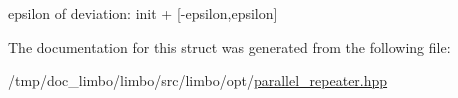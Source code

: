 epsilon of deviation\+: init + \mbox{[}-\/epsilon,epsilon\mbox{]} 



The documentation for this struct was generated from the following file\+:\begin{DoxyCompactItemize}
\item 
/tmp/doc\+\_\+limbo/limbo/src/limbo/opt/\hyperlink{parallel__repeater_8hpp}{parallel\+\_\+repeater.\+hpp}\end{DoxyCompactItemize}
